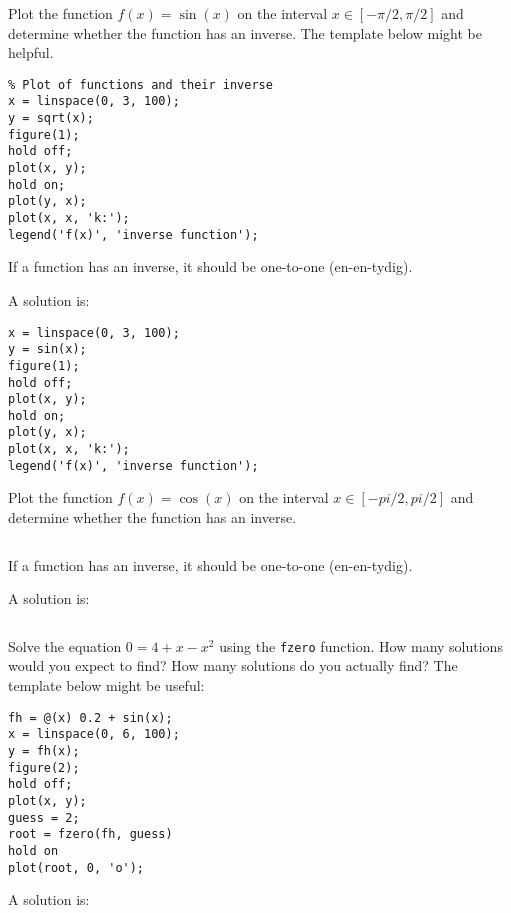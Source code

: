 \begin{ex}
Plot the function $f(x) = \sin(x)$ on the interval $x \in [-\pi/2, \pi/2]$
and determine whether the function has an inverse.
The template below might be helpful.
\begin{lstlisting}
% Plot of functions and their inverse
x = linspace(0, 3, 100);
y = sqrt(x);
figure(1);
hold off;
plot(x, y);
hold on; 
plot(y, x);
plot(x, x, 'k:');
legend('f(x)', 'inverse function');
\end{lstlisting}
\begin{hint}
If a function has an inverse, it should be one-to-one (en-en-tydig).
\end{hint}
\begin{sol}
A solution is:
\begin{lstlisting}
x = linspace(0, 3, 100);
y = sin(x);
figure(1);
hold off;
plot(x, y);
hold on; 
plot(y, x);
plot(x, x, 'k:');
legend('f(x)', 'inverse function');
\end{lstlisting}
\end{sol}
\end{ex}



\begin{ex}
Plot the function $f(x) = \cos(x)$ on the interval $x \in [-pi/2, pi/2]$
and determine whether the function has an inverse.
\begin{lstlisting}
\end{lstlisting}
\begin{hint}
If a function has an inverse, it should be one-to-one (en-en-tydig).
\end{hint}
\begin{sol}
A solution is:
\begin{lstlisting}
\end{lstlisting}
\end{sol}
\end{ex}




\begin{ex}\label{exfzero}%
Solve the equation $0 = 4 + x - x^2$ using the \verb!fzero! function.
How many solutions would you expect to find? How many solutions do 
you actually find?
The template below might be useful:
\begin{lstlisting}
fh = @(x) 0.2 + sin(x);
x = linspace(0, 6, 100);
y = fh(x);
figure(2);
hold off;
plot(x, y); 
guess = 2;
root = fzero(fh, guess)
hold on
plot(root, 0, 'o');
\end{lstlisting}
\begin{hint}
\end{hint}
\begin{sol}
A solution is:
\begin{lstlisting}
\end{lstlisting}
\end{sol}
\end{ex}

